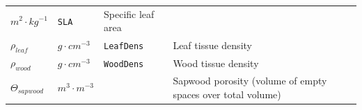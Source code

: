 \documentclass[]{book}
\begin{document}
\begin{longtable}[]{@{}llll@{}}
\begin{minipage}[t]{0.10\columnwidth}
\(m^2 \cdot kg^{-1}\)\strut
\end{minipage} & \begin{minipage}[t]{0.12\columnwidth}\raggedright\strut
\texttt{SLA}\strut
\end{minipage} & \begin{minipage}[t]{0.45\columnwidth}\raggedright\strut
Specific leaf area\strut
\end{minipage}\tabularnewline
\begin{minipage}[t]{0.11\columnwidth}\raggedright\strut
\(\rho_{leaf}\)\strut
\end{minipage} & \begin{minipage}[t]{0.10\columnwidth}\raggedright\strut
\(g \cdot cm^{-3}\)\strut
\end{minipage} & \begin{minipage}[t]{0.12\columnwidth}\raggedright\strut
\texttt{LeafDens}\strut
\end{minipage} & \begin{minipage}[t]{0.45\columnwidth}\raggedright\strut
Leaf tissue density\strut
\end{minipage}\tabularnewline
\begin{minipage}[t]{0.11\columnwidth}\raggedright\strut
\(\rho_{wood}\)\strut
\end{minipage} & \begin{minipage}[t]{0.10\columnwidth}\raggedright\strut
\(g \cdot cm^{-3}\)\strut
\end{minipage} & \begin{minipage}[t]{0.12\columnwidth}\raggedright\strut
\texttt{WoodDens}\strut
\end{minipage} & \begin{minipage}[t]{0.45\columnwidth}\raggedright\strut
Wood tissue density\strut
\end{minipage}\tabularnewline
\begin{minipage}[t]{0.11\columnwidth}\raggedright\strut
\(\Theta_{sapwood}\)\strut
\end{minipage} & \begin{minipage}[t]{0.10\columnwidth}\raggedright\strut
\(m^3 \cdot m^{-3}\)\strut
\end{minipage} & \begin{minipage}[t]{0.12\columnwidth}\raggedright\strut
\strut
\end{minipage} & \begin{minipage}[t]{0.45\columnwidth}\raggedright\strut
Sapwood porosity (volume of empty spaces over total volume)\strut
\end{minipage}\tabularnewline

\end{longtable}
\end{document}

